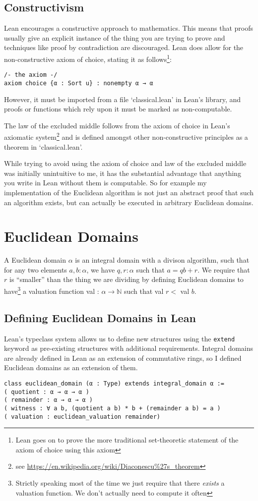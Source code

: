 \documentclass{article}
\newcommand{\N}{\ensuremath{\mathbb{N}}}
\renewcommand{\a}{\alpha}
\newcommand{\ct}{\texttt}
\begin{document}
\subsection{Constructivism}
Lean encourages a constructive approach to mathematics. 
This means that proofs usually give an explicit instance of the thing you are trying to prove and techniques like proof by contradiction are discouraged.
Lean does allow for the non-constructive axiom of choice, stating it as follows\footnote{Lean goes on to prove the more traditional set-theoretic statement of the axiom of choice using this axiom}: 
\begin{lstlisting}
/- the axiom -/
axiom choice {α : Sort u} : nonempty α → α
\end{lstlisting}
However, it must be imported from a file `classical.lean' in Lean's library, and proofs or functions which rely upon it must be marked as non-computable.

The law of the excluded middle follows from the axiom of choice in Lean's axiomatic system\footnote{see \url{https://en.wikipedia.org/wiki/Diaconescu\%27s\_theorem}} and is defined amongst other non-constructive principles as a theorem in `classical.lean'. 

While trying to avoid using the axiom of choice and law of the excluded middle was initially unintuitive to me, it has the substantial advantage that anything you write in Lean without them is computable.
So for example my implementation of the Euclidean algorithm is not just an abstract proof that such an algorithm exists, but can actually be executed in arbitrary Euclidean domains.

\section{Euclidean Domains}
A Euclidean domain $\a$ is an integral domain with a divison algorithm, such that for any two elements $a,b :\a$, we have $q,r : \a$ such that $a=qb+r$.
We require that $r$ is ``smaller'' than the thing we are dividing by defining Euclidean domains to have\footnote{Strictly speaking most of the time we just require that there \textit{exists} a valuation function. We don't actually need to compute it often} a valuation function val : $\a \to \N$ such that val $r < $ val $b$.

\subsection{Defining Euclidean Domains in Lean}
Lean's typeclass system allows us to define new structures using the \ct{extend} keyword as pre-existing structures with additional requirements.
Integral domains are already defined in Lean as an extension of commutative rings, so I defined Euclidean domains as an extension of them.
\begin{lstlisting}
class euclidean_domain (α : Type) extends integral_domain α :=
( quotient : α → α → α )
( remainder : α → α → α )
( witness : ∀ a b, (quotient a b) * b + (remainder a b) = a )
( valuation : euclidean_valuation remainder)
\end{lstlisting}
\end{document}
